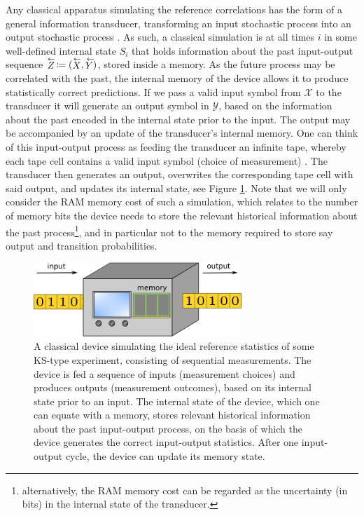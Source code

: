 Any classical apparatus simulating the reference correlations has the form of a general information transducer, transforming an input stochastic process into an output stochastic process \cite{Cabello2018}. As such, a classical simulation is at all times $i$ in some well-defined internal state $S_i$ that holds information about the past input-output sequence $\oset{\leftarrow}{Z}\thinspace\coloneqq(\oset{\leftarrow}{X},\oset{\leftarrow}{Y})$, stored inside a memory. As the future process may be correlated with the past, the internal memory of the device allows it to produce statistically correct predictions. If we pass a valid input symbol from $\mathcal{X}$ to the transducer it will generate an output symbol in $\mathcal{Y}$, based on the information about the past encoded in the internal state prior to the input. The output may be accompanied by an update of the transducer's internal memory. One can think of this input-output process as feeding the transducer an infinite tape, whereby each tape cell contains a valid input symbol (choice of measurement) . The transducer then generates an output, overwrites the corresponding tape cell with said output, and updates its internal state, see Figure \ref{fig:transducer}. Note that we will only consider the RAM memory cost of such a simulation, which relates to the number of memory bits the device needs to store the relevant historical information about the past process\footnote{alternatively, the RAM memory cost can be regarded as the uncertainty (in bits) in the internal state of the transducer.}, and in particular not to the memory required to store say output and transition probabilities.

\begin{figure}
    \centering
    \includegraphics[width=0.7\textwidth]{images/transducer.png}
    \caption{A classical device simulating the ideal reference statistics of some KS-type experiment, consisting of sequential measurements. The device is fed a sequence of inputs (measurement choices) and produces outputs (measurement outcomes), based on its internal state prior to an input. The internal state of the device, which one can equate with a memory, stores relevant historical information about the past input-output process, on the basis of which the device generates the correct input-output statistics. After one input-output cycle, the device can update its memory state.}
    \label{fig:transducer}
\end{figure}

